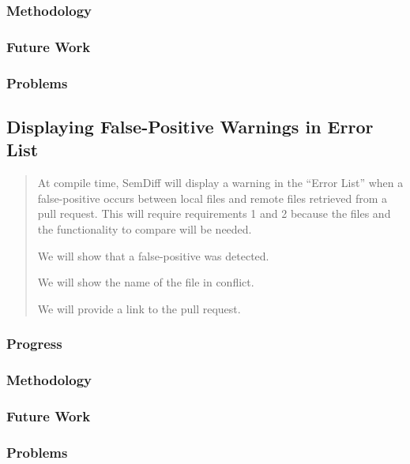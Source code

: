 \documentclass[draftclsnofoot,onecolumn]{IEEEtran}
\begin{document}
\subsubsection{Methodology}

\subsubsection{Future Work}

\subsubsection{Problems}






\subsection{Displaying False-Positive Warnings in Error List}

\begin{quote}

At compile time, SemDiff will display a warning in the “Error List” when a false-positive occurs between local files and remote files retrieved from a pull request. This will require requirements 1 and 2 because the files and the functionality to compare will be needed.

We will show that a false-positive was detected.

We will show the name of the file in conflict.

We will provide a link to the pull request.

\end{quote}

\subsubsection{Progress}

\subsubsection{Methodology}

\subsubsection{Future Work}

\subsubsection{Problems}
\end{document}
